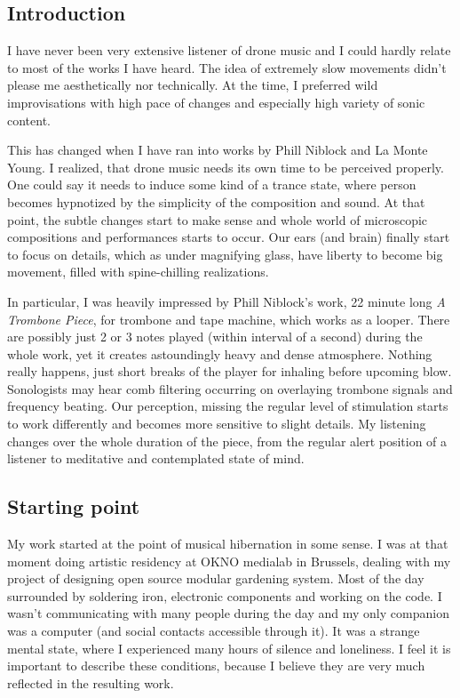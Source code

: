 \documentclass[12pt,a4paper,oneside]{report}
\begin{document}
\subsection{Introduction} I have never been very extensive listener of drone music and I could hardly relate to most of the works I have heard. The idea of extremely slow movements didn't please me aesthetically nor technically. At the time, I preferred wild improvisations with high pace of changes and especially high variety of sonic content.

This has changed when I have ran into works by Phill Niblock and La Monte Young. I realized, that drone music needs its own time to be perceived properly. One could say it needs to induce some kind of a trance state, where person becomes hypnotized by the simplicity of the composition and sound. At that point, the subtle changes start to make sense and whole world of microscopic compositions and performances starts to occur. Our ears (and brain) finally start to focus on details, which as under magnifying glass, have liberty to become big movement, filled with spine-chilling realizations.

In particular, I was heavily impressed by Phill Niblock's work, 22 minute long \emph{A Trombone Piece}, for trombone and tape machine, which works as a looper. There are possibly just 2 or 3 notes played (within interval of a second) during the whole work, yet it creates astoundingly heavy and dense atmosphere. Nothing really happens, just short breaks of the player for inhaling before upcoming blow. Sonologists may hear comb filtering occurring on overlaying trombone signals and frequency beating. Our perception, missing the regular level of stimulation starts to work differently and becomes more sensitive to slight details. My listening changes over the whole duration of the piece, from the regular alert position of a listener to meditative and contemplated state of mind. 

\subsection{Starting point} My work started at the point of musical hibernation in some sense. I was at that moment doing artistic residency at OKNO medialab in Brussels, dealing with my project of designing open source modular gardening system. Most of the day surrounded by soldering iron, electronic components and working on the code. I wasn't communicating with many people during the day and my only companion was a computer (and social contacts accessible through it). It was a strange mental state, where I experienced many hours of silence and loneliness. I feel it is important to describe these conditions, because I believe they are very much reflected in the resulting work. 
\end{document}
